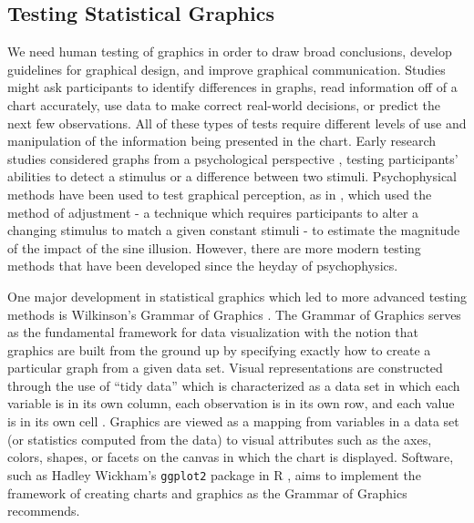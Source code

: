 \documentclass[12pt]{article}
\begin{document}
\hypertarget{testing-statistical-graphics}{%
\subsection{Testing Statistical
Graphics}\label{testing-statistical-graphics}}

We need human testing of graphics in order to draw broad conclusions,
develop guidelines for graphical design, and improve graphical
communication. Studies might ask participants to identify differences in
graphs, read information off of a chart accurately, use data to make
correct real-world decisions, or predict the next few observations. All
of these types of tests require different levels of use and manipulation
of the information being presented in the chart. Early research studies
considered graphs from a psychological perspective
\citep{spence1990visual, lewandowsky1989perception}, testing
participants' abilities to detect a stimulus or a difference between two
stimuli. Psychophysical methods have been used to test graphical
perception, as in \citet{vanderplas2015signs}, which used the method of
adjustment - a technique which requires participants to alter a changing
stimulus to match a given constant stimuli \citep{gescheider_1997} - to
estimate the magnitude of the impact of the sine illusion. However,
there are more modern testing methods that have been developed since the
heyday of psychophysics.

One major development in statistical graphics which led to more advanced
testing methods is Wilkinson's Grammar of Graphics
\citep{wilkinson2013grammar}. The Grammar of Graphics serves as the
fundamental framework for data visualization with the notion that
graphics are built from the ground up by specifying exactly how to
create a particular graph from a given data set. Visual representations
are constructed through the use of ``tidy data'' which is characterized
as a data set in which each variable is in its own column, each
observation is in its own row, and each value is in its own cell
\citep{wickham2016r}. Graphics are viewed as a mapping from variables in
a data set (or statistics computed from the data) to visual attributes
such as the axes, colors, shapes, or facets on the canvas in which the
chart is displayed. Software, such as Hadley Wickham's \texttt{ggplot2}
package in R \citep{wickham2011ggplot2}, aims to implement the framework
of creating charts and graphics as the Grammar of Graphics recommends.
\end{document}
